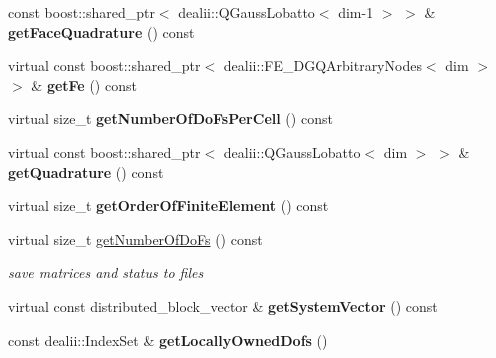 \begin{DoxyCompactItemize}
\item 
\hypertarget{classnatrium_1_1SEDGMinLee_a42897893820c9d12e9fea6f5518e3447}{
const boost::shared\_\-ptr$<$ dealii::QGaussLobatto$<$ dim-\/1 $>$ $>$ \& {\bfseries getFaceQuadrature} () const }
\label{classnatrium_1_1SEDGMinLee_a42897893820c9d12e9fea6f5518e3447}

\item 
\hypertarget{classnatrium_1_1SEDGMinLee_ab7cd0a95e74da6d4d16ab2d174b17458}{
virtual const boost::shared\_\-ptr$<$ dealii::FE\_\-DGQArbitraryNodes$<$ dim $>$ $>$ \& {\bfseries getFe} () const }
\label{classnatrium_1_1SEDGMinLee_ab7cd0a95e74da6d4d16ab2d174b17458}

\item 
\hypertarget{classnatrium_1_1SEDGMinLee_a5dac839ef4963af315dba5f201bd763c}{
virtual size\_\-t {\bfseries getNumberOfDoFsPerCell} () const }
\label{classnatrium_1_1SEDGMinLee_a5dac839ef4963af315dba5f201bd763c}

\item 
\hypertarget{classnatrium_1_1SEDGMinLee_ad36da36624c983cf84716d97442b1989}{
virtual const boost::shared\_\-ptr$<$ dealii::QGaussLobatto$<$ dim $>$ $>$ \& {\bfseries getQuadrature} () const }
\label{classnatrium_1_1SEDGMinLee_ad36da36624c983cf84716d97442b1989}

\item 
\hypertarget{classnatrium_1_1SEDGMinLee_a954e80fd9475bd4c617b573a96b5290e}{
virtual size\_\-t {\bfseries getOrderOfFiniteElement} () const }
\label{classnatrium_1_1SEDGMinLee_a954e80fd9475bd4c617b573a96b5290e}

\item 
virtual size\_\-t \hyperlink{classnatrium_1_1SEDGMinLee_af667cda1a894340f614da67c0a0ae5da}{getNumberOfDoFs} () const 
\begin{DoxyCompactList}\small\item\em save matrices and status to files \item\end{DoxyCompactList}\item 
\hypertarget{classnatrium_1_1SEDGMinLee_ac4d17489cf8bf5e98bd7bd4e3e32f0d4}{
virtual const distributed\_\-block\_\-vector \& {\bfseries getSystemVector} () const }
\label{classnatrium_1_1SEDGMinLee_ac4d17489cf8bf5e98bd7bd4e3e32f0d4}

\item 
\hypertarget{classnatrium_1_1SEDGMinLee_a790e9783ea5c3ce34b1a4e82332eda4c}{
const dealii::IndexSet \& {\bfseries getLocallyOwnedDofs} ()}
\label{classnatrium_1_1SEDGMinLee_a790e9783ea5c3ce34b1a4e82332eda4c}


\end{DoxyCompactItemize}
